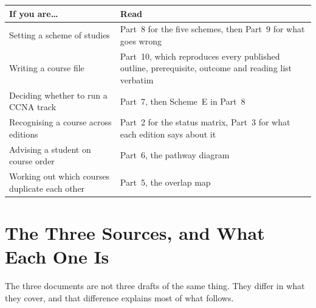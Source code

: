 \documentclass[11pt,a4paper,oneside]{report}
\begin{document}
\begin{longtable}{@{}L{5.4cm}L{10.1cm}@{}}
\toprule
{}
\textbf{If you are\ldots} & \textbf{Read} \\
\midrule
\endhead
Setting a scheme of studies &
Part~8 for the five schemes, then Part~9 for what goes wrong \\
Writing a course file &
Part~10, which reproduces every published outline, prerequisite, outcome and
reading list verbatim \\
Deciding whether to run a CCNA track &
Part~7, then Scheme~E in Part~8 \\
Recognising a course across editions &
Part~2 for the status matrix, Part~3 for what each edition says about it \\
Advising a student on course order &
Part~6, the pathway diagram \\
Working out which courses duplicate each other &
Part~5, the overlap map \\
\bottomrule
\end{longtable}

\section{The Three Sources, and What Each One Is}

The three documents are not three drafts of the same thing. They differ in what
they cover, and that difference explains most of what follows.
\end{document}
